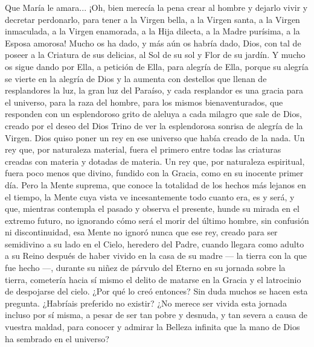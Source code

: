 \documentclass[12pt]{book} %
\begin{document}
Que María le amara... ¡Oh, bien merecía la pena crear al hombre y dejarlo vivir y decretar perdonarlo, para tener a la Virgen bella, a la Virgen santa, a la Virgen inmaculada, a la Virgen enamorada, a la Hija dilecta, a la Madre purísima, a la Esposa amorosa! Mucho os ha dado, y más aún os habría dado, Dios, con tal de poseer a la Criatura de sus delicias, al Sol de su sol y Flor de su jardín. Y mucho os sigue dando por Ella, a petición de Ella, para alegría de Ella, porque su alegría se vierte en la alegría de Dios y la aumenta con destellos que llenan de resplandores la luz, la gran luz del Paraíso, y cada resplandor es una gracia para el universo, para la raza del hombre, para los mismos bienaventurados, que responden con un esplendoroso grito de aleluya a cada milagro que sale de Dios, creado por el deseo del Dios Trino de ver la esplendorosa sonrisa de alegría de la Virgen. 
Dios quiso poner un rey en ese universo que había creado de la nada. Un rey que, por naturaleza material, fuera el 
primero entre todas las criaturas creadas con materia y dotadas de materia. Un rey que, por naturaleza espiritual, fuera poco menos que divino, fundido con la Gracia, como en su inocente primer día. Pero la Mente suprema, que conoce la totalidad de los hechos más lejanos en el tiempo, la Mente cuya vista ve incesantemente todo cuanto era, es y será, y que, mientras contempla el pasado y observa el presente, hunde su mirada en el extremo futuro, no ignorando cómo será el morir del último hombre, sin confusión ni discontinuidad, esa Mente no ignoró nunca que ese rey, creado para ser semidivino a su lado en el Cielo, heredero del Padre, cuando llegara como adulto a su Reino después de haber vivido en la casa de su madre — la tierra con la que fue hecho —, durante su niñez de párvulo del Eterno en su jornada sobre la tierra, cometería hacia sí mismo el delito de matarse en la Gracia y el latrocinio de despojarse del cielo. 
¿Por qué lo creó entonces? Sin duda muchos se hacen esta pregunta. ¿Habríais preferido no existir? ¿No merece ser vivida esta jornada incluso por sí misma, a pesar de ser tan pobre y desnuda, y tan severa a causa de vuestra maldad, para conocer y admirar la Belleza infinita que la mano de Dios ha sembrado en el universo? 
\end{document}
